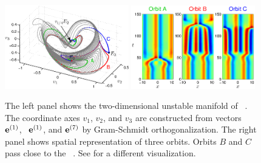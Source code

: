 \begin{figure}[ht]
\begin{center}
\includegraphics[width=0.48\textwidth, clip=true]{figs/ks22_E2_manifold_c.eps}
\includegraphics[width=0.48\textwidth, clip=true]{figs/ks22_E2_orbits_c.eps}
\end{center}
\caption{
The left panel shows the two-dimensional
unstable manifold of \eqv\ . The coordinate axes
$v_1$, $v_2$, and $v_3$ are constructed from vectors
\Re\, ${\mathbf e}^{(1)}$, \Im\, ${\mathbf e}^{(1)}$, and ${\mathbf e}^{(7)}$
by Gram-Schmidt orthogonalization.
The right panel shows spatial representation of three orbits. Orbits
$B$ and $C$ pass close to the \eqv\ . See
 for a different visualization.
       }
\label{f:KS22E2man}
\end{figure}


